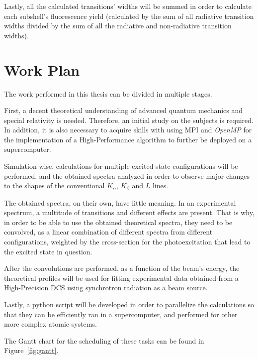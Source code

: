  Lastly, all the calculated transitions' widths will be summed in order to calculate each subshell's fluorescence yield (calculated by the sum of all radiative transition widths divided by the sum of all the radiative and non-radiative transition widths).



\section{Work Plan}

The work performed in this thesis can be divided in multiple stages.

First, a decent theoretical understanding of advanced quantum mechanics and special relativity is needed. Therefore, an initial study on the subjects is required. In addition, it is also necessary to acquire skills with using \gls{MPI} and \textit{OpenMP} for the implementation of a High-Performance algorithm to further be deployed on a supercomputer.

Simulation-wise, calculations for multiple excited state configurations will be performed, and the obtained spectra analyzed in order to observe major changes to the shapes of the conventional $K_{\alpha}$, $K_{\beta}$ and $L$ lines. 

The obtained spectra, on their own, have little meaning. In an experimental spectrum, a multitude of transitions and different effects are present. That is why, in order to be able to use the obtained theoretical spectra, they need to be convolved, as a linear combination of different spectra from different configurations, weighted by the cross-section for the photoexcitation that lead to the excited state in question.

After the convolutions are performed, as a function of the beam's energy, the theoretical profiles will be used for fitting experimental data obtained from a High-Precision \gls{DCS} using synchrotron radiation as a beam source.

Lastly, a python script will be developed in order to parallelize the calculations so that they can be efficiently ran in a supercomputer, and performed for other more complex atomic systems.

The Gantt chart for the scheduling of these tasks can be found in Figure~\ref{fig:gantt}.

